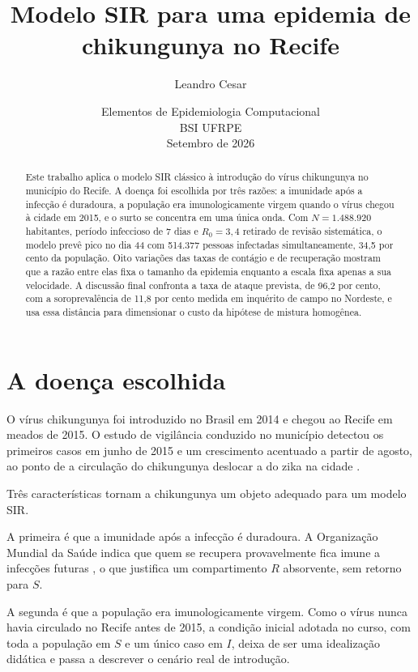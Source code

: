 \documentclass[11pt,a4paper]{article}
\title{\textbf{Modelo SIR para uma epidemia de chikungunya no Recife}}
\author{Leandro Cesar}
\date{Elementos de Epidemiologia Computacional \\ BSI UFRPE \\[0.6em] Setembro de 2026}
\begin{document}
\maketitle

\begin{abstract}
\noindent
Este trabalho aplica o modelo SIR clássico à introdução do vírus chikungunya no município do Recife.
A doença foi escolhida por três razões: a imunidade após a infecção é duradoura, a população era
imunologicamente virgem quando o vírus chegou à cidade em 2015, e o surto se concentra em uma única onda.
Com $N = 1.488.920$ habitantes, período infeccioso de 7 dias e $R_0 = 3{,}4$ retirado de revisão
sistemática, o modelo prevê pico no dia 44 com 514.377 pessoas infectadas simultaneamente, 34,5 por cento
da população. Oito variações das taxas de contágio e de recuperação mostram que a razão entre elas fixa
o tamanho da epidemia enquanto a escala fixa apenas a sua velocidade. A discussão final confronta a taxa
de ataque prevista, de 96,2 por cento, com a soroprevalência de 11,8 por cento medida em inquérito de
campo no Nordeste, e usa essa distância para dimensionar o custo da hipótese de mistura homogênea.
\end{abstract}

\section{A doença escolhida}

O vírus chikungunya foi introduzido no Brasil em 2014 e chegou ao Recife em meados de 2015. O estudo de
vigilância conduzido no município detectou os primeiros casos em junho de 2015 e um crescimento acentuado
a partir de agosto, ao ponto de a circulação do chikungunya deslocar a do zika na cidade
\cite{magalhaes2017}.

Três características tornam a chikungunya um objeto adequado para um modelo SIR.

A primeira é que a imunidade após a infecção é duradoura. A Organização Mundial da Saúde indica que quem
se recupera provavelmente fica imune a infecções futuras \cite{who}, o que justifica um compartimento $R$
absorvente, sem retorno para $S$.

A segunda é que a população era imunologicamente virgem. Como o vírus nunca havia circulado no Recife
antes de 2015, a condição inicial adotada no curso, com toda a população em $S$ e um único caso em $I$,
deixa de ser uma idealização didática e passa a descrever o cenário real de introdução.
\end{document}
